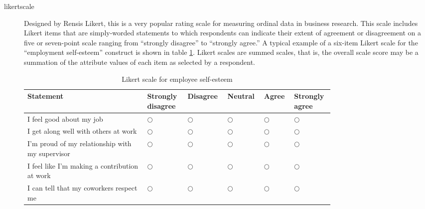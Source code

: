 \begin{description}
	\item[\Gls{likertscale}] Designed by Rensis Likert, this is a very popular rating scale for measuring ordinal data in business research. This scale includes Likert items that are simply-worded statements to which respondents can indicate their extent of agreement or disagreement on a five or seven-point scale ranging from ``strongly disagree'' to ``strongly agree.'' A typical example of a six-item Likert scale for the ``employment self-esteem'' construct is shown in table \ref{tab06.03}. Likert scales are summed scales, that is, the overall scale score may be a summation of the attribute values of each item as selected by a respondent.
	
	\begin{table}[H]
		\centering
		\begin{tabularx}{0.95\linewidth}{p{0.35\linewidth}p{0.10\linewidth}p{0.08\linewidth}p{0.07\linewidth}p{0.07\linewidth}p{0.08\linewidth}}
			\toprule
			{\footnotesize Statement} & {\footnotesize Strongly disagree} & {\footnotesize Disagree} & {\footnotesize Neutral} & {\footnotesize Agree} & {\footnotesize Strongly agree} \\
			\midrule
			{\footnotesize I feel good about my job} & $ \bigcirc $ & $ \bigcirc $ & $ \bigcirc $ & $ \bigcirc $ & $ \bigcirc $ \\
			{\footnotesize I get along well with others at work} & $ \bigcirc $ & $ \bigcirc $ & $ \bigcirc $ & $ \bigcirc $ & $ \bigcirc $ \\
			{\footnotesize I'm proud of my relationship with my supervisor} & $ \bigcirc $ & $ \bigcirc $ & $ \bigcirc $ & $ \bigcirc $ & $ \bigcirc $ \\
			{\footnotesize I feel like I'm making a contribution at work} & $ \bigcirc $ & $ \bigcirc $ & $ \bigcirc $ & $ \bigcirc $ & $ \bigcirc $ \\
			{\footnotesize I can tell that my coworkers respect me} & $ \bigcirc $ & $ \bigcirc $ & $ \bigcirc $ & $ \bigcirc $ & $ \bigcirc $ \\
			\bottomrule
		\end{tabularx}
		\caption{Likert scale for employee self-esteem}
		\label{tab06.03}
	\end{table}
	

\end{description}
